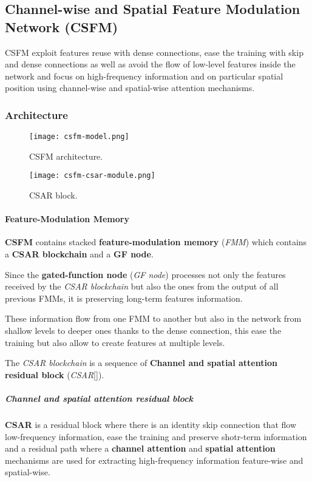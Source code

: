 \subsection{Channel-wise and Spatial Feature Modulation Network (CSFM\cite{CSFM})}

CSFM exploit features reuse with dense connections, ease the training with skip and dense connections as well as avoid the flow of low-level features inside the network and focus on high-frequency information  and on particular spatial position using channel-wise and spatial-wise attention mechanisms.

\subsubsection{Architecture}
\begin{figure}
    \centering
    \texttt{[image: csfm-model.png]}
    \caption{CSFM architecture.}\label{csfm:architecture}
\end{figure}

\begin{figure}
    \centering
    \texttt{[image: csfm-csar-module.png]}
    \caption{CSAR block.}\label{csfm:csar}
\end{figure}

\paragraph{Feature-Modulation Memory}
\textbf{CSFM} contains stacked \textbf{feature-modulation memory} (\textit{FMM}) which contains a \textbf{CSAR blockchain} and a \textbf{GF node}.

Since the \textbf{gated-function node} (\textit{GF node}) processes not only the features received by the \textit{CSAR blockchain} but also the ones from the output of all previous FMMs, it is preserving long-term features information.

These information flow from one FMM to another but also in the network from shallow levels to deeper ones thanks to the dense connection, this ease the training but also allow to create features at multiple levels.

The \textit{CSAR blockchain} is a sequence of \textbf{Channel and spatial attention residual block} (\textit{CSAR}[]).

\subparagraph{Channel and spatial attention residual block} \textbf{CSAR} is a residual block where there is an identity skip connection that flow low-frequency information, ease the training and preserve shotr-term information and a residual path where a \textbf{channel attention} and \textbf{spatial attention} mechanisms are used for extracting high-frequency information feature-wise and spatial-wise.

